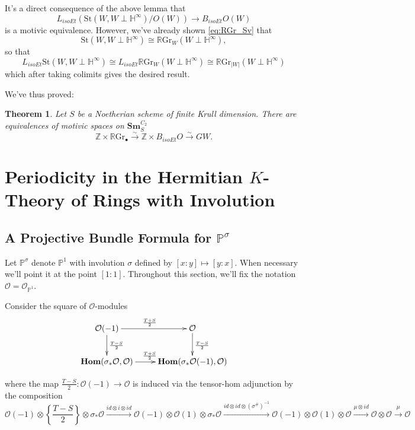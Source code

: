 \documentclass[edeposit,fullpage]{uiucthesis2009}
\newcommand{\Z}{\mathbb Z}
\newcommand{\mbb}{\mathbb}
\newcommand{\mc}{\mathcal}
\newcommand{\RGr}{\mathbb R\mathrm{Gr}}
\newcommand{\Sm}[1]{\mathbf{Sm}_{#1}}
\newcommand{\St}{\mathrm{St}}
\DeclareMathOperator{\iHom}{\mathbf{Hom}}
\theoremstyle{plain}
\numberwithin{lemma}{section}
\newtheorem{theorem}[lemma]{Theorem}
\theoremstyle{definition}
\begin{document}
It's a direct consequence of the above lemma that 
\[
L_{isoEt}(\St(W,W\perp \mbb H^\infty)/O(W))
\rightarrow B_{isoEt}O(W)
\]
is a motivic equivalence. However, we've already shown \eqref{eq:RGr_Sv} that
\[
\St(W,W\perp \mbb H^\infty) \cong \RGr_W(W \perp \mbb H^\infty),
\]
so that 
\[
L_{isoEt}\St(W,W\perp \mbb H^\infty) \cong L_{isoEt}\RGr_W(W \perp
\mbb H^\infty) \cong \RGr_{|W|}(W \perp \mbb H^\infty)
\]
which after taking colimits gives the desired result. 

We've thus proved:

\begin{theorem}\label{thm:RGr_GW_nonreg}
Let $S$ be a Noetherian scheme of finite Krull dimension. There are
equivalences of motivic spaces on $\Sm{S}^{C_2}$
\[
\Z \times \RGr_\bullet \xrightarrow{\sim} \Z \times B_{isoEt}O
\xrightarrow{\sim} GW.
\]
\end{theorem}

\chapter{Periodicity in the Hermitian $K$-Theory of Rings with Involution}\label{chap:Einf}

\section{A Projective Bundle Formula for $\mbb P^\sigma$}

Let $\mbb P^\sigma$ denote $\mbb P^1$ with involution $\sigma$ defined
by $[x:y] \mapsto
[y:x]$. When necessary we'll point it at the point $[1:1]$. Throughout this section, we'll fix the notation $\mc O = \mc
O_{\mbb P^1}$.

Consider the square of $\mc O$-modules
\begin{equation}\label{diag:prebott}
\xymatrix{\mc O(-1)\ar[r]^{\frac{T+S}{2}}\ar[d]^{\frac{T-S}{2}} & \mc O \ar[d]^{\frac{T-S}{2}} \\ \iHom(\sigma_*\mc
  O,\mc O) \ar[r]^{\frac{T+S}{2}} & \iHom(\sigma_* \mc O(-1),\mc O)}
\end{equation}

where the map $\frac{T-S}{2} : \mc O(-1) \rightarrow \mc
O$ is induced via the tensor-hom adjunction by the composition 
\begin{equation}\label{eq:TminSone}
\mc O(-1) \otimes \left\{\frac{T-S}{2}\right\} \otimes \sigma_* \mc O
\xrightarrow{id \otimes i \otimes id}
\mc O(-1) \otimes \mc O(1) \otimes \sigma_*\mc O  
\xrightarrow{id \otimes id \otimes (\sigma^\#)^{-1}} \mc O(-1) \otimes
\mc O(1) \otimes \mc O \xrightarrow{\mu \otimes id} \mc O \otimes \mc
O \xrightarrow{\mu} \mc O
\end{equation}
\end{document}
